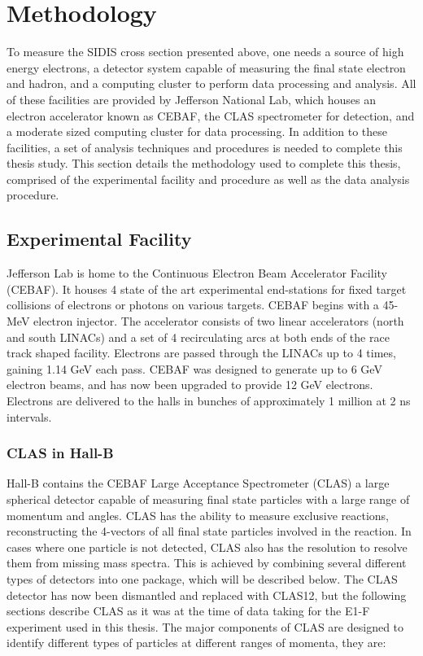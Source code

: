 \section{Methodology}
To measure the SIDIS cross section presented above, one needs a source of high energy electrons, a detector system capable of measuring the final state electron and hadron, and a computing cluster to perform data processing and analysis.  All of these facilities are provided by Jefferson National Lab, which houses an electron accelerator known as CEBAF, the CLAS spectrometer for detection, and a moderate sized computing cluster for data processing.  In addition to these facilities, a set of analysis techniques and procedures is needed to complete this thesis study.  This section details the methodology used to complete this thesis, comprised of the experimental facility and procedure as well as the data analysis procedure.

\subsection{Experimental Facility}
Jefferson Lab is home to the Continuous Electron Beam Accelerator Facility (CEBAF).  It houses 4 state of the art experimental end-stations for fixed target collisions of electrons or photons on various targets.  CEBAF begins with a 45-MeV electron injector.  The accelerator consists of two linear accelerators (north and south LINACs) and a set of 4 recirculating arcs at both ends of the race track shaped facility.  Electrons are passed through the LINACs up to 4 times, gaining 1.14 GeV each pass.  CEBAF was designed to generate up to 6 GeV electron beams, and has now been upgraded to provide 12 GeV electrons. Electrons are delivered to the halls in bunches of approximately 1 million at 2 ns intervals.

\subsubsection{CLAS in Hall-B}
Hall-B contains the CEBAF Large Acceptance Spectrometer (CLAS) a large spherical detector capable of measuring final state particles with a large range of momentum and angles.  CLAS has the ability to measure exclusive reactions, reconstructing the 4-vectors of all final state particles involved in the reaction.  In cases where one particle is not detected, CLAS also has the resolution to resolve them from missing mass spectra.  This is achieved by combining several different types of detectors into one package, which will be described below.  The CLAS detector has now been dismantled and replaced with CLAS12, but the following sections describe CLAS as it was at the time of data taking for the E1-F experiment used in this thesis.  The major components of CLAS \cite{clas} are designed to identify different types of particles at different ranges of momenta, they are:

